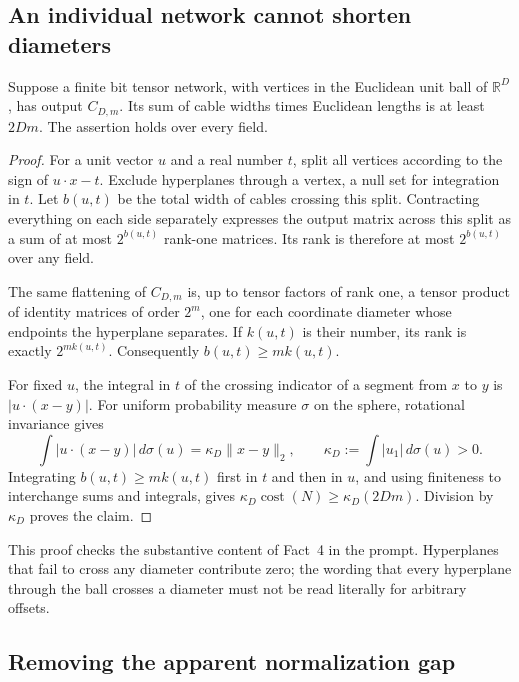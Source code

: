 \subsection{An individual network cannot shorten diameters}

\begin{proposition}
\label{prop:single-network}
Suppose a finite bit tensor network, with vertices in the Euclidean unit ball
of $\mathbb R^D$, has output $C_{D,m}$.  Its sum of cable widths times
Euclidean lengths is at least $2Dm$.  The assertion holds over every field.
\end{proposition}
\begin{proof}
For a unit vector $u$ and a real number $t$, split all vertices according to
the sign of $u\cdot x-t$.  Exclude hyperplanes through a vertex, a null set
for integration in $t$.  Let $b(u,t)$ be the total width of cables crossing
this split.  Contracting everything on each side separately expresses the
output matrix across this split as a sum of at most $2^{b(u,t)}$ rank-one
matrices.  Its rank is therefore at most $2^{b(u,t)}$ over any field.

The same flattening of $C_{D,m}$ is, up to tensor factors of rank one, a
tensor product of identity matrices of order $2^m$, one for each coordinate
diameter whose endpoints the hyperplane separates.  If $k(u,t)$ is their
number, its rank is exactly $2^{m k(u,t)}$.  Consequently
$b(u,t)\ge m k(u,t)$.

For fixed $u$, the integral in $t$ of the crossing indicator of a segment
from $x$ to $y$ is $|u\cdot(x-y)|$.  For uniform probability measure
$\sigma$ on the sphere, rotational invariance gives
\[
 \int |u\cdot(x-y)|\,d\sigma(u)=\kappa_D\|x-y\|_2,
 \qquad \kappa_D:=\int|u_1|\,d\sigma(u)>0.
\]
Integrating $b(u,t)\ge m k(u,t)$ first in $t$ and then in $u$, and using
finiteness to interchange sums and integrals, gives
$\kappa_D\operatorname{cost}(N)\ge\kappa_D(2Dm)$.  Division by
$\kappa_D$ proves the claim.
\end{proof}

This proof checks the substantive content of Fact~4 in the prompt.
Hyperplanes that fail to cross any diameter contribute zero; the wording
that every hyperplane through the ball crosses a diameter must not be read
literally for arbitrary offsets.

\subsection{Removing the apparent normalization gap}

